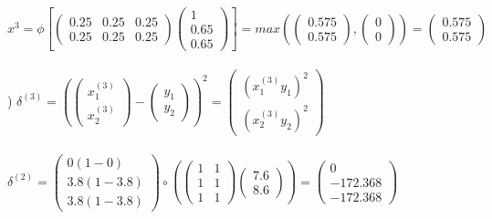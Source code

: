 \documentclass[12pt]{article}
\begin{document}
\indent $x^3 = \phi\left[
\begin{pmatrix}
0.25 & 0.25 & 0.25\\
0.25 & 0.25 & 0.25
\end{pmatrix}
\begin{pmatrix}
1\\ 0.65\\ 0.65
\end{pmatrix}\right]= max\left(
\begin{pmatrix}
0.575 \\ 0.575
\end{pmatrix}, 
\begin{pmatrix}
0\\ 0
\end{pmatrix}\right) = 
\begin{pmatrix}
0.575 \\ 0.575
\end{pmatrix}$\\



\noindent \hrulefill \\



) $\delta^{(3)} = \left(
\begin{pmatrix}
x_1^{(3)} \\ x_2^{(3)}
\end{pmatrix} - 
\begin{pmatrix}
y_1 \\ y_2
\end{pmatrix}\right)^2 = 
\begin{pmatrix}
(x_1^{(3)}y_1)^2 \\ (x_2^{(3)}y_2)^2
\end{pmatrix}$\\\\

\indent $\delta^{(2)} = 
\begin{pmatrix}
0(1 - 0) \\ 3.8(1 - 3.8) \\ 3.8(1 - 3.8)
\end{pmatrix} \circ \left(
\begin{pmatrix}
1 & 1 \\
1 & 1 \\
1 & 1 
\end{pmatrix}
\begin{pmatrix}
7.6 \\ 8.6
\end{pmatrix} \right) = 
\begin{pmatrix}
0 \\ -172.368 \\ -172.368
\end{pmatrix}
$\\\\
\end{document}
